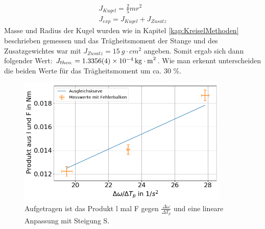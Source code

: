 \begin{align}
	J_{Kugel}=\frac{2}{5}mr^2\\
	J_{exp}=J_{Kugel}+J_{Zusatz}
	\label{eq:J}
\end{align}
Masse und Radius der Kugel wurden wie in Kapitel \ref{kap:KreiselMethoden} beschrieben gemessen und das Trägheitsmoment der Stange und des Zusatzgewichtes war mit $J_{Zusatz}=\SI{15}{g \cdot cm^2}$ angeben. Somit ergab sich dann folgender Wert: $J_{theo.}=\SI{1,3356+-0,0004e-4}{kg \cdot m^2}$. Wie man erkennt unterscheiden die beiden Werte für das Trägheitsmoment um ca. 30 \%.
\begin{figure}[h]
	\centering
	\includegraphics[width=0.9\textwidth]{res/wtgegenlF.png}
	\caption{Aufgetragen ist das Produkt l mal F gegen $\frac{\Delta \omega}{\Delta T_p }$ und eine lineare Anpassung mit Steigung S.} 
	\label{fig:Kreisel}
\end{figure}
